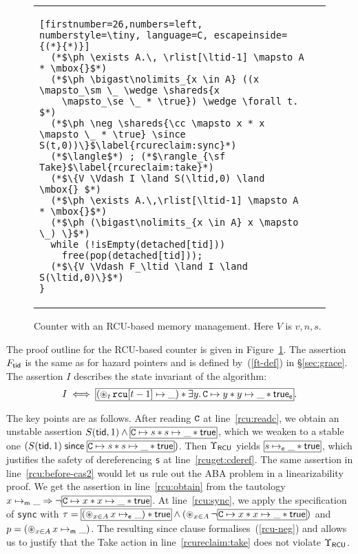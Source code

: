 \begin{figure}[t]
\begin{tabular}{@{\quad\ }l@{}l@{}}
\begin{minipage}[b]{0.7\linewidth}
{\begin{lstlisting}[firstnumber=26,numbers=left, numberstyle=\tiny, language=C, escapeinside={(*}{*)}]
  (*$\ph \exists A.\, \rlist[\ltid-1] \mapsto A * \mbox{}$*)
  (*$\ph \bigast\nolimits_{x \in A} ((x \mapsto_\sm \_ \wedge \shareds{x
    \mapsto_\se \_ * \true}) \wedge \forall t.  $*)
  (*$\ph \neg \shareds{\cc \mapsto x * x \mapsto \_ * \true} \since S(t,0))\}$\label{rcureclaim:sync}*)
  (*$\langle$*) ; (*$\rangle_{\sf Take}$\label{rcureclaim:take}*)
  (*$\{V \Vdash I \land S(\ltid,0) \land \mbox{} $*)
  (*$\ph \exists A.\,\rlist[\ltid-1] \mapsto A * \mbox{}$*)
  (*$\ph (\bigast\nolimits_{x \in A} x \mapsto \_) \}$*)
  while (!isEmpty(detached[tid]))
    free(pop(detached[tid]));
  (*$\{V \Vdash F_\ltid \land I \land S(\ltid,0)\}$*)
}
\end{lstlisting}
}
\end{minipage}
\end{tabular}
\caption{\label{fig:RCUCounterProof2}\small
Counter with an RCU-based memory management. 
Here $V$ is $v, n,s$.}
\end{figure}


The proof outline for the RCU-based counter is given in
Figure~\ref{fig:RCUCounterProof2}. The assertion $F_{\sf tid}$ is the same as for
hazard pointers and is defined by~(\ref{ft-def}) in \S\ref{sec:grace}.  The
assertion $I$ describes the state invariant of the algorithm:
$$
I \iff \shared{
  (\bigast\nolimits_{t} \rcu[t-1] \mapsto \_  )
  * \exists y.\, \cc \mapsto y * y \mapsto \_ * \true_\se}.
$$

The key points are as follows.  After reading $\texttt{C}$ at line~\ref{rcu:readc}, we
obtain an unstable assertion $S(\ltid,1) \land \shared{\cc \mapsto s * s \mapsto
  \_ * \true}$, which we weaken to a stable one $(S(\ltid,1) \since \shared{\cc
  \mapsto s * s \mapsto \_ * \true})$.  Then $\Upsilon_{\textsf{RCU}}$ yields $\shared{s
  \mapsto_\se \_ * \true}$, which justifies the safety of dereferencing {\tt s}
at line~\ref{rcuget:cderef}. The same assertion in line~\ref{rcu:before-cas2}
would let us rule out the ABA problem in a linearizability proof. We get the
assertion in line~\ref{rcu:obtain} from the tautology $x \mapsto_\sm \_
\Rightarrow \neg\shareds{\cc \mapsto x * x \mapsto \_ * \true}$. At
line~\ref{rcu:sync}, we apply the specification of {\tt sync} with $\tau =
\shareds{(\bigast\nolimits_{x \in A} x \mapsto_\se \_) * \true}
\wedge
(\bigast\nolimits_{x \in A}\neg \shareds{\cc \mapsto x * x \mapsto \_ *
    \true})$ and $p =
(\mathop{\circledast}\limits\nolimits_{x \in A} x \mapsto_{\sf m} \_)$. The resulting
{\sf since} clause formalises~(\ref{rcu-neg}) and allows us to justify that the
{\sf Take} action in line~\ref{rcureclaim:take} does not violate
$\Upsilon_{\textsf{RCU}}$. 

